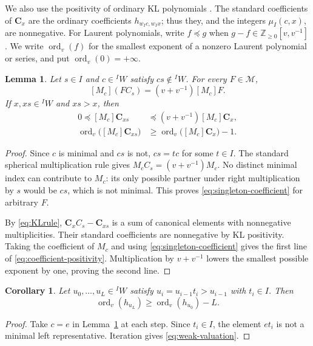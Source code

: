\documentclass[11pt,a4paper,reqno]{amsart}
\numberwithin{equation}{section}
\newtheorem{lemma}[theorem]{Lemma}
\newtheorem{corollary}[theorem]{Corollary}
\theoremstyle{definition}
\theoremstyle{remark}
\theoremstyle{plain}
\newcommand{\C}{\mathbf C}
\newcommand{\M}{\mathcal M}
\newcommand{\ord}{\operatorname{ord}_v}
\newcommand{\mus}{\mu_I}
\begin{document}
We also use the positivity of ordinary KL polynomials
\cite[Corollary~1.2(1)]{EW14}. The standard coefficients of
$\C_x$ are the ordinary coefficients $h_{w_Ic,w_Ix}$;
thus they, and the integers $\mus(c,x)$, are nonnegative.
For Laurent polynomials, write $f\preceq g$ when
$g-f\in\mathbb Z_{\geq0}[v,v^{-1}]$.
We write $\ord(f)$ for the smallest exponent of a nonzero Laurent
polynomial or series, and put $\ord(0)=+\infty$.

\begin{lemma}\label{lem:coefficient-positivity}
Let $s\in I$ and $c\in{}^I W$ satisfy $cs\notin{}^I W$.
For every $F\in\M$,
\begin{equation}\label{eq:singleton-coefficient}
 [M_c](FC_s)=(v+v^{-1})[M_c]F.
\end{equation}
If $x,xs\in{}^I W$ and $xs>x$, then
\begin{equation}\label{eq:coefficient-positivity}
\begin{aligned}
 0\preceq[M_c]\C_{xs}
 &\preceq(v+v^{-1})[M_c]\C_x,\\
 \ord\bigl([M_c]\C_{xs}\bigr)
 &\geq\ord\bigl([M_c]\C_x\bigr)-1.
\end{aligned}
\end{equation}
\end{lemma}
\begin{proof}
Since $c$ is minimal and $cs$ is not, $cs=tc$ for some $t\in I$.
The standard spherical multiplication rule gives
$M_cC_s=(v+v^{-1})M_c$.
No distinct minimal index can contribute to $M_c$: its only possible
partner under right multiplication by $s$ would be $cs$, which is not
minimal. This proves \eqref{eq:singleton-coefficient} for arbitrary $F$.

By \eqref{eq:KLrule}, $\C_xC_s-\C_{xs}$ is a sum of canonical
elements with nonnegative multiplicities. Their standard coefficients
are nonnegative by KL positivity. Taking the coefficient of $M_c$ and
using \eqref{eq:singleton-coefficient} gives the first line of
\eqref{eq:coefficient-positivity}. Multiplication by $v+v^{-1}$
lowers the smallest possible exponent by one, proving the second line.
\end{proof}

\begin{corollary}\label{cor:weak-valuation}
Let $u_0,\ldots,u_L\in{}^I W$ satisfy
$u_i=u_{i-1}t_i>u_{i-1}$ with $t_i\in I$. Then
\begin{equation}\label{eq:weak-valuation}
 \ord(h_{u_L})\geq\ord(h_{u_0})-L.
\end{equation}
\end{corollary}
\begin{proof}
Take $c=e$ in Lemma~\ref{lem:coefficient-positivity} at each step.
Since $t_i\in I$, the element $et_i$ is not a minimal left
representative. Iteration gives \eqref{eq:weak-valuation}.
\end{proof}
\end{document}

